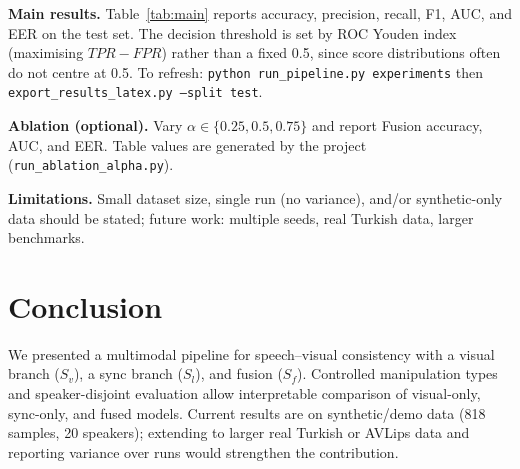 \documentclass{article}
\begin{document}
\textbf{Main results.} Table~\ref{tab:main} reports accuracy, precision, recall, F1, AUC, and EER on the test set. The decision threshold is set by ROC Youden index (maximising $TPR - FPR$) rather than a fixed 0.5, since score distributions often do not centre at 0.5. To refresh: \texttt{python run\_pipeline.py experiments} then \texttt{export\_results\_latex.py --split test}.



\textbf{Ablation (optional).} Vary $\alpha \in \{0.25, 0.5, 0.75\}$ and report Fusion accuracy, AUC, and EER. Table values are generated by the project (\texttt{run\_ablation\_alpha.py}).


\textbf{Limitations.} Small dataset size, single run (no variance), and/or synthetic-only data should be stated; future work: multiple seeds, real Turkish data, larger benchmarks.

\section{Conclusion}
We presented a multimodal pipeline for speech--visual consistency with a visual branch ($S_v$), a sync branch ($S_l$), and fusion ($S_f$). Controlled manipulation types and speaker-disjoint evaluation allow interpretable comparison of visual-only, sync-only, and fused models. Current results are on synthetic/demo data (818 samples, 20 speakers); extending to larger real Turkish or AVLips data and reporting variance over runs would strengthen the contribution.



\end{document}
